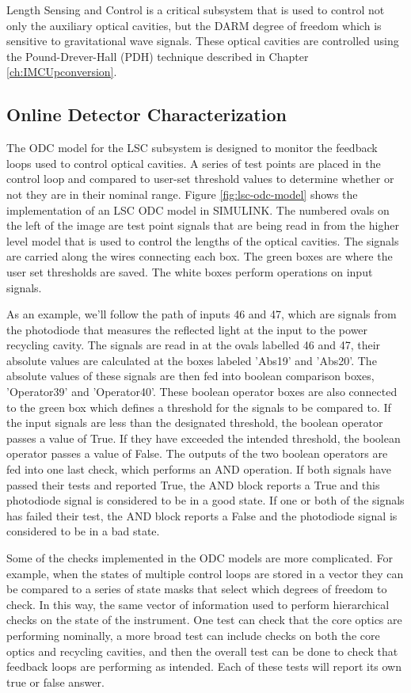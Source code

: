 Length Sensing and Control is a critical subsystem that is used to control
not only the auxiliary optical cavities, but the DARM degree of freedom which
is sensitive to gravitational wave signals.
These optical cavities are controlled using the Pound-Drever-Hall (PDH) 
technique described in Chapter \ref{ch:IMCUpconversion}.

\subsection{Online Detector Characterization}

The ODC model for the LSC subsystem is designed to monitor the feedback 
loops used to control optical cavities. A series of test points are placed 
in the control loop and compared to user-set threshold values to determine 
whether or not they are in their nominal range. 
Figure \ref{fig:lsc-odc-model} shows the implementation of an LSC ODC 
model in SIMULINK. The numbered ovals on the left of the image are test point 
signals that are being read in from the higher level model that is used to control the 
lengths of the optical cavities. The signals are carried along the wires connecting 
each box. The green boxes are where the user set thresholds are saved. The white 
boxes perform operations on input signals.

As an example, we'll follow the path of inputs 46 and 47, which are signals from 
the photodiode that measures the reflected light at the input to the power recycling 
cavity. The signals are read in at the ovals labelled 46 and 47, their absolute values 
are calculated at the boxes labeled 'Abs19' and 'Abs20'. The absolute values of these 
signals are then fed into boolean comparison boxes, 'Operator39' and 'Operator40'. 
These boolean operator boxes are also connected to the green box which defines a 
threshold for the signals to be compared to. If the input signals are less than the 
designated threshold, the boolean operator passes a value of True. If they have 
exceeded the intended threshold, the boolean operator passes a value of False. 
The outputs of the two boolean operators are fed into one last check, which performs 
an AND operation. If both signals have passed their tests and reported True, the AND 
block reports a True and this photodiode signal is considered to be in a good state. 
If one or both of the signals has failed their test, the AND block reports a False 
and the photodiode signal is considered to be in a bad state. 

Some of the checks implemented in the ODC models are more complicated. For 
example, when 
the states of multiple control loops are stored in a vector they can be compared to a 
series of state masks that select which degrees of freedom to check. 
In this way, the same vector of information used to perform hierarchical 
checks on the state of the instrument. 
One test can check that the core optics are performing nominally, a more broad 
test can include checks on both the core optics and recycling cavities, and 
then the overall test can be done to check that feedback loops are performing as intended. 
Each of these tests will report its own true or false answer. 


